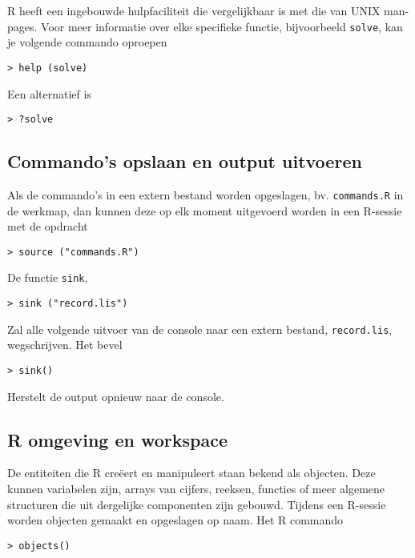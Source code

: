R heeft een ingebouwde hulpfaciliteit die vergelijkbaar is met die van UNIX man-pages. Voor meer informatie over elke specifieke functie, bijvoorbeeld \texttt{solve}, kan je volgende commando oproepen

\begin{lstlisting}
> help (solve)
\end{lstlisting}

Een alternatief is
\begin{lstlisting}
> ?solve
\end{lstlisting}

\subsection{Commando's opslaan en output uitvoeren}

Als de commando's in een extern bestand worden opgeslagen, bv. \texttt{commands.R} in de werkmap, dan kunnen deze op elk moment uitgevoerd worden in een R-sessie met de opdracht

\begin{lstlisting}
> source ("commands.R")
\end{lstlisting}

De functie \texttt{sink},

\begin{lstlisting}
> sink ("record.lis")
\end{lstlisting}

Zal alle volgende uitvoer van de console naar een extern bestand, \texttt{record.lis}, wegschrijven. Het bevel

\begin{lstlisting}
> sink()
\end{lstlisting}

Herstelt de output opnieuw naar de console.

\subsection{R omgeving en workspace}

De entiteiten die R creëert en manipuleert staan bekend als objecten. Deze kunnen variabelen zijn, arrays
van cijfers, reeksen, functies of meer algemene structuren die uit dergelijke componenten zijn gebouwd.
Tijdens een R-sessie worden objecten gemaakt en opgeslagen op naam. Het R commando

\begin{lstlisting}
> objects()
\end{lstlisting}

